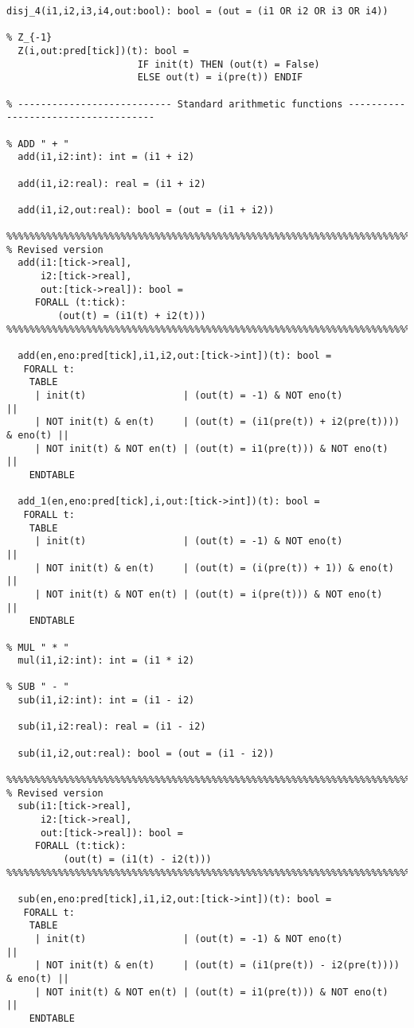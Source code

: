 \begin{singlespace}
\begin{lstlisting}[tabsize=2, language=PVS]
  disj_4(i1,i2,i3,i4,out:bool): bool = (out = (i1 OR i2 OR i3 OR i4))

% Z_{-1}
  Z(i,out:pred[tick])(t): bool = 
                       IF init(t) THEN (out(t) = False) 
                       ELSE out(t) = i(pre(t)) ENDIF

% --------------------------- Standard arithmetic functions ------------------------------------

% ADD " + "
  add(i1,i2:int): int = (i1 + i2)

  add(i1,i2:real): real = (i1 + i2)

  add(i1,i2,out:real): bool = (out = (i1 + i2))

%%%%%%%%%%%%%%%%%%%%%%%%%%%%%%%%%%%%%%%%%%%%%%%%%%%%%%%%%%%%%%%%%%%%%%%%%
% Revised version
  add(i1:[tick->real],
      i2:[tick->real],
      out:[tick->real]): bool =
     FORALL (t:tick):
         (out(t) = (i1(t) + i2(t)))
%%%%%%%%%%%%%%%%%%%%%%%%%%%%%%%%%%%%%%%%%%%%%%%%%%%%%%%%%%%%%%%%%%%%%%%%%

  add(en,eno:pred[tick],i1,i2,out:[tick->int])(t): bool = 
   FORALL t:
    TABLE
     | init(t)                 | (out(t) = -1) & NOT eno(t)                    || 
     | NOT init(t) & en(t)     | (out(t) = (i1(pre(t)) + i2(pre(t)))) & eno(t) ||
     | NOT init(t) & NOT en(t) | (out(t) = i1(pre(t))) & NOT eno(t)            ||
    ENDTABLE

  add_1(en,eno:pred[tick],i,out:[tick->int])(t): bool = 
   FORALL t:
    TABLE
     | init(t)                 | (out(t) = -1) & NOT eno(t)          || 
     | NOT init(t) & en(t)     | (out(t) = (i(pre(t)) + 1)) & eno(t) ||
     | NOT init(t) & NOT en(t) | (out(t) = i(pre(t))) & NOT eno(t)   ||
    ENDTABLE

% MUL " * "
  mul(i1,i2:int): int = (i1 * i2)

% SUB " - " 
  sub(i1,i2:int): int = (i1 - i2)

  sub(i1,i2:real): real = (i1 - i2)

  sub(i1,i2,out:real): bool = (out = (i1 - i2))

%%%%%%%%%%%%%%%%%%%%%%%%%%%%%%%%%%%%%%%%%%%%%%%%%%%%%%%%%%%%%%%%%%%%%%%%%
% Revised version
  sub(i1:[tick->real],
      i2:[tick->real],
      out:[tick->real]): bool =
     FORALL (t:tick):
          (out(t) = (i1(t) - i2(t)))
%%%%%%%%%%%%%%%%%%%%%%%%%%%%%%%%%%%%%%%%%%%%%%%%%%%%%%%%%%%%%%%%%%%%%%%%%

  sub(en,eno:pred[tick],i1,i2,out:[tick->int])(t): bool = 
   FORALL t:
    TABLE
     | init(t)                 | (out(t) = -1) & NOT eno(t)                    || 
     | NOT init(t) & en(t)     | (out(t) = (i1(pre(t)) - i2(pre(t)))) & eno(t) ||
     | NOT init(t) & NOT en(t) | (out(t) = i1(pre(t))) & NOT eno(t)            ||
    ENDTABLE


\end{lstlisting}
\end{singlespace}
